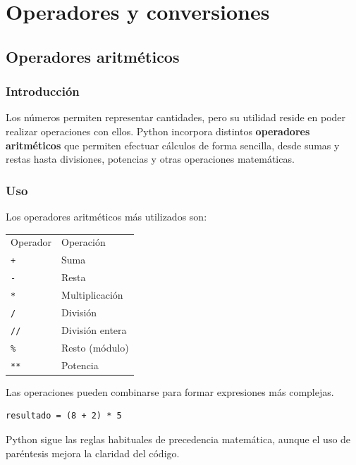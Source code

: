 \documentclass[11pt,a5paper,twoside]{book}
\begin{document}
\chapter{Operadores y conversiones}

\section{Operadores aritméticos}
\subsection{Introducción}
Los números permiten representar cantidades, pero su utilidad reside en poder realizar operaciones con ellos.
Python incorpora distintos \textbf{operadores aritméticos} que permiten efectuar cálculos de forma sencilla, desde sumas y restas hasta divisiones, potencias y otras operaciones matemáticas.
\subsection{Uso}
Los operadores aritméticos más utilizados son:

\newpage

\begin{tcolorbox}
\begin{tabular}{ll}
 Operador  &  Operación        \\
 {\scriptsize \texttt{+}}       &  Suma             \\
 {\scriptsize \texttt{-}}       &  Resta            \\
 {\scriptsize \texttt{*}}       &  Multiplicación   \\
 {\scriptsize \texttt{/}}       &  División         \\
 {\scriptsize \texttt{//}}      &  División entera  \\
 {\scriptsize \texttt{\%}}       &  Resto (módulo)   \\
 {\scriptsize \texttt{**}}      &  Potencia         \\
\end{tabular}
\end{tcolorbox}
Las operaciones pueden combinarse para formar expresiones más complejas.


\begin{tcolorbox}
\scriptsize
 \begin{verbatim}
resultado = (8 + 2) * 5
\end{verbatim}
\end{tcolorbox}
Python sigue las reglas habituales de precedencia matemática, aunque el uso de paréntesis mejora la claridad del código.
\end{document}
